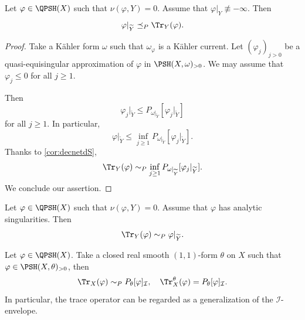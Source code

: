 \begin{proposition}\label{prop:Trdominarest}
    Let $\varphi\in \QPSH(X)$ such that $\nu(\varphi,Y)=0$.
    Assume that $\varphi|_Y\not\equiv -\infty$.
    Then
    \[
    \varphi|_{\widetilde{Y}}\preceq_P \Tr_Y(\varphi).
    \]
\end{proposition}
\begin{proof}
    Take a Kähler form $\omega$ such that $\omega_{\varphi}$ is a Kähler current.
    Let $(\varphi_j)_{j>0}$ be a quasi-equisingular approximation of $\varphi$ in $\PSH(X,\omega)_{>0}$.
    We may assume that $\varphi_j\leq 0$ for all $j\geq 1$.


    Then
    \begin{equation}\label{eq:varphijrestrleqPtemp}
    \varphi_j|_{\widetilde{Y}}\leq P_{\omega|_{\widetilde{Y}}}\left[\varphi_j|_{\widetilde{Y}}\right]
    \end{equation}
    for all $j\geq 1$. In particular,
    \[
    \varphi|_{\widetilde{Y}}\leq \inf_{j\geq 1}P_{\omega|_{\widetilde{Y}}}\left[\varphi_j|_{\widetilde{Y}}\right].
    \]
    Thanks to \cref{cor:decnetdS},
\begin{equation}\label{eq:TrYnewexpression}
\Tr_Y(\varphi)\sim_P \inf_{j\geq 1} P_{\omega|_{\widetilde{Y}}}[\varphi_j|_{\widetilde{Y}}].
\end{equation}
  We conclude our assertion.
\end{proof}

\begin{example}\label{ex:resanalyt}
    Let $\varphi\in \QPSH(X)$ such that $\nu(\varphi,Y)=0$. Assume that $\varphi$ has analytic singularities. Then
    \[
        \Tr_Y(\varphi)\sim_P \varphi|_{\widetilde{Y}}.
    \]
\end{example}

\begin{example}\label{ex:trace:L236}
    Let $\varphi\in \QPSH(X)$. Take a closed real smooth $(1,1)$-form $\theta$ on $X$ such that $\varphi\in \PSH(X,\theta)_{>0}$, then
    \[
        \Tr_X(\varphi)\sim_P P_{\theta}[\varphi]_{\mathcal{I}},\quad   \Tr^{\theta}_X(\varphi) = P_{\theta}[\varphi]_{\mathcal{I}}.
    \]
    In particular, the trace operator can be regarded as a generalization of the $\mathcal{I}$-envelope.
\end{example}

